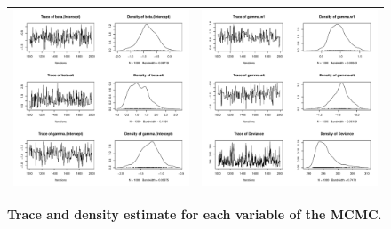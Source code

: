 \documentclass[a4paper, 12pt, leqno]{article}\usepackage[]{graphicx}\usepackage[]{color}
\begin{document}
\begin{figure} 
  \begin{center}
    \begin{tabular}{cc}
      \includegraphics[width=8cm]{figures/mcmc-siteocc1.pdf} &
      \includegraphics[width=8cm]{figures/mcmc-siteocc2.pdf} \\
    \end{tabular}
  \end{center}
  \caption{\textbf{Trace and density estimate for each variable of the MCMC}.}
  \label{fig:mcmc-siteocc}
\end{figure}
\end{document}
